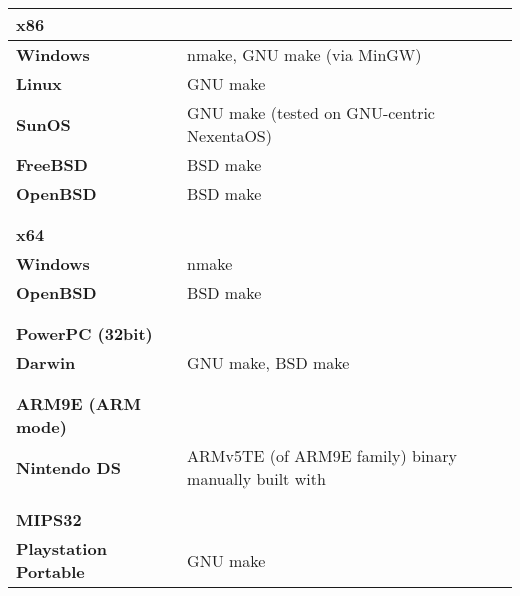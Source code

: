 \begin{tabular}{l l}
{\bf{\large x86}} &                                           \\
\hline\hline
{\bf Windows}     & nmake, GNU make (via MinGW)               \\
{\bf Linux}       & GNU make                                  \\
{\bf SunOS}       & GNU make (tested on GNU-centric NexentaOS)\\
{\bf FreeBSD}     & BSD make                                  \\
{\bf OpenBSD}     & BSD make                                  \\
\hline
                  &                                           \\
                  &                                           \\


{\bf{\large x64}} &                                           \\
\hline\hline
{\bf Windows}     & nmake                                     \\
{\bf OpenBSD}     & BSD make                                  \\
\hline
                  &                                           \\
                  &                                           \\


{\bf{\large PowerPC (32bit)}} &                               \\
\hline\hline
{\bf Darwin}                  & GNU make, BSD make            \\
\hline
                  &                                           \\
                  &                                           \\


{\bf{\large ARM9E (ARM mode)}} &                             \\
\hline\hline
{\bf Nintendo DS} & ARMv5TE (of ARM9E family) binary manually built with \cite{devkitPro}\\
\hline
                  &                                           \\
                  &                                           \\
		  
{\bf{\large MIPS32}} &              \\
\hline\hline
{\bf Playstation Portable} & GNU make                        \\
\hline

\end{tabular}\\

